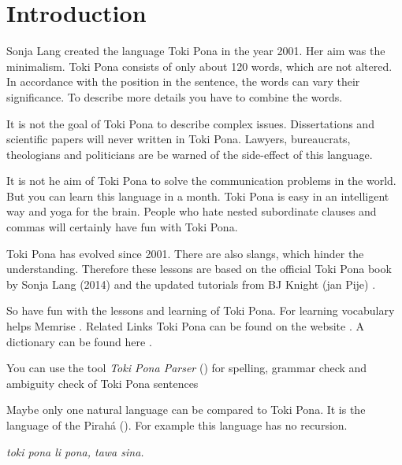 \section{Introduction}
%
Sonja Lang created the language Toki Pona in the year 2001. 
Her aim was the minimalism. 
Toki Pona consists of only about 120 words, which are not altered. 
In accordance with the position in the sentence, the words can vary their significance. 
To describe more details you have to combine the words.

It is not the goal of Toki Pona to describe complex issues. 
Dissertations and scientific papers will never written in Toki Pona. 
Lawyers, bureaucrats, theologians and politicians are be warned of the side-effect of this language.

It is not he aim of Toki Pona to solve the communication problems in the world. 
But you can learn this language in a month. 
Toki Pona is easy in an intelligent way and yoga for the brain. 
People who hate nested subordinate clauses and commas will certainly have fun with Toki Pona.

Toki Pona has evolved since 2001. 
There are also slangs, which hinder the understanding. 
Therefore these lessons are based on the official Toki Pona book \cite{www:tokipona.org} by Sonja Lang (2014) and the updated tutorials from BJ Knight (jan Pije) \cite{www:Pije:01}.

So have fun with the lessons and learning of Toki Pona. 
For learning vocabulary helps Memrise \cite{www:memrise:01}. Related Links Toki Pona can be found on the website \cite{www:rowa:01}. 
A dictionary can be found here \cite{www:rowa:01}. 

You can use the tool \textit{Toki Pona Parser} (\cite{www:rowa:02}) for spelling, grammar check and ambiguity check of Toki Pona sentences 

Maybe only one natural language can be compared to Toki Pona. 
It is the language of the Pirah\'{a} (\cite{www:piraha:01}). 
For example this language has no recursion. 

\textit{toki pona li pona, tawa sina.}
%
